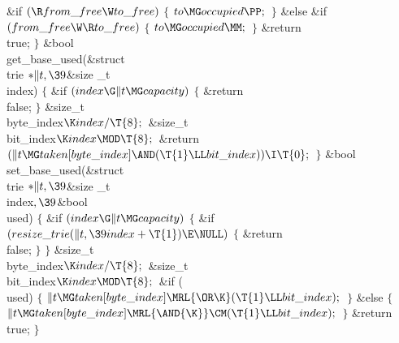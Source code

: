 \&{if} ${}(\R\\{from\_free}\W\\{to\_free}){}$\5
${}\{{}$\1\6
${}\\{to}\MG\\{occupied}\PP;{}$\6
\4${}\}{}$\2\6
\&{else} \&{if} ${}(\\{from\_free}\W\R\\{to\_free}){}$\5
${}\{{}$\1\6
${}\\{to}\MG\\{occupied}\MM;{}$\6
\4${}\}{}$\2\6
\&{return} \\{true};\6
\4${}\}{}$\2\7
\1\1\&{bool} \\{get\_base\_used}(\&{struct} \\{trie} ${}{*}\|t,\39{}$\&{size%
\_t} \\{index})\2\2\6
${}\{{}$\1\6
\&{if} ${}(\\{index}\G\|t\MG\\{capacity}){}$\5
${}\{{}$\1\6
\&{return} \\{false};\6
\4${}\}{}$\2\7
\&{size\_t} \\{byte\_index}${}\K\\{index}/\T{8};{}$\6
\&{size\_t} \\{bit\_index}${}\K\\{index}\MOD\T{8};{}$\7
\&{return} ${}(\|t\MG\\{taken}[\\{byte\_index}]\AND(\T{1}\LL\\{bit\_index}))\I%
\T{0};{}$\6
\4${}\}{}$\2\7
\1\1\&{bool} \\{set\_base\_used}(\&{struct} \\{trie} ${}{*}\|t,\39{}$\&{size%
\_t} \\{index}${},\39{}$\&{bool} \\{used})\2\2\6
${}\{{}$\1\6
\&{if} ${}(\\{index}\G\|t\MG\\{capacity}){}$\5
${}\{{}$\1\6
\&{if} ${}(\\{resize\_trie}(\|t,\39\\{index}+\T{1})\E\NULL){}$\5
${}\{{}$\1\6
\&{return} \\{false};\6
\4${}\}{}$\2\6
\4${}\}{}$\2\7
\&{size\_t} \\{byte\_index}${}\K\\{index}/\T{8};{}$\6
\&{size\_t} \\{bit\_index}${}\K\\{index}\MOD\T{8};{}$\7
\&{if} (\\{used})\5
${}\{{}$\1\6
${}\|t\MG\\{taken}[\\{byte\_index}]\MRL{{\OR}{\K}}(\T{1}\LL\\{bit\_index});{}$\6
\4${}\}{}$\2\6
\&{else}\5
${}\{{}$\1\6
${}\|t\MG\\{taken}[\\{byte\_index}]\MRL{\AND{\K}}\CM(\T{1}\LL\\{bit%
\_index});{}$\6
\4${}\}{}$\2\6
\&{return} \\{true};\6
\4${}\}{}$\2\par
\fi

